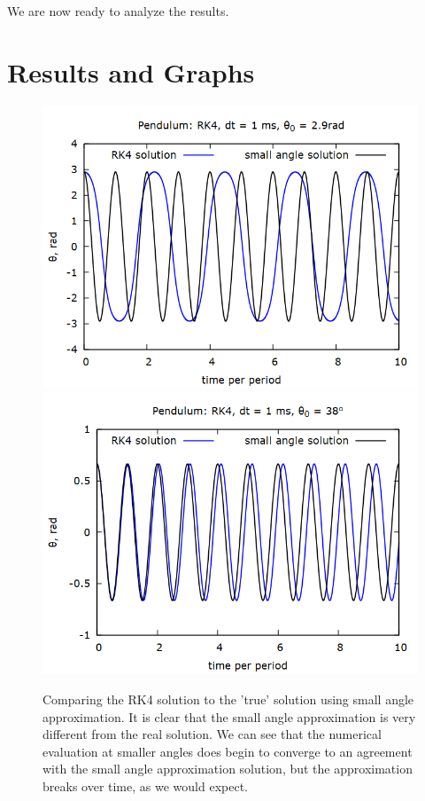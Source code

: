 \documentclass[aps,prl,twocolumn,superscriptaddress]{revtex4-1}
\begin{document}
We are now ready to analyze the results.

\section{Results and Graphs}

\begin{figure}[htbp]
  	\begin{center}
 		\includegraphics[scale=0.3]{pendfunc.png}
 		\includegraphics[scale=0.3]{pendfunc38.png}
  		\caption{Comparing the RK4 solution to the 'true' solution using small angle approximation. It is clear that the small angle approximation is very different from the real solution. We can see that the numerical evaluation at smaller angles does begin to converge to an agreement with the small angle approximation solution, but the approximation breaks over time, as we would expect.}
  		\label{gr:pendfunc}
 	\end{center}
\end{figure}
\end{document}
